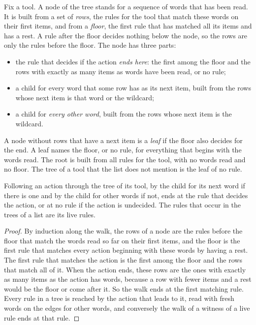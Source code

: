 \documentclass[acmsmall,nonacm,screen]{acmart}
\begin{document}
Fix a tool. A node of the tree stands for a sequence of words that has been read. It is built
from a set of \emph{rows}, the rules for the tool that match these words on their first
items, and from a \emph{floor}, the first rule that has matched all its items and has a rest.
A rule after the floor decides nothing below the node, so the rows are only the rules before
the floor. The node has three parts:
\begin{itemize}
\item the rule that decides if the action \emph{ends here}: the first among the floor and the
  rows with exactly as many items as words have been read, or no rule;
\item a child for every word that some row has as its next item, built from the rows whose
  next item is that word or the wildcard;
\item a child for \emph{every other word}, built from the rows whose next item is the
  wildcard.
\end{itemize}
A node without rows that have a next item is a \emph{leaf} if the floor also decides for the
end. A leaf names the floor, or no rule, for everything that begins with the words read. The
root is built from all rules for the tool, with no words read and no floor. The tree of a
tool that the list does not mention is the leaf of no rule.

\begin{theorem}\label{thm:tree}
Following an action through the tree of its tool, by the child for its next word if there is
one and by the child for other words if not, ends at the rule that decides the action, or at
no rule if the action is undecided. The rules that occur in the trees of a list are its live
rules.
\end{theorem}

\begin{proof}
By induction along the walk, the rows of a node are the rules before the floor that match the
words read so far on their first items, and the floor is the first rule that matches every
action beginning with these words by having a rest. The first rule that matches the action is
the first among the floor and the rows that match all of it. When the action ends, these rows
are the ones with exactly as many items as the action has words, because a row with fewer
items and a rest would be the floor or come after it. So the walk ends at the first matching
rule. Every rule in a tree is reached by the action that leads to it, read with fresh words
on the edges for other words, and conversely the walk of a witness of a live rule ends at
that rule.
\end{proof}
\end{document}
